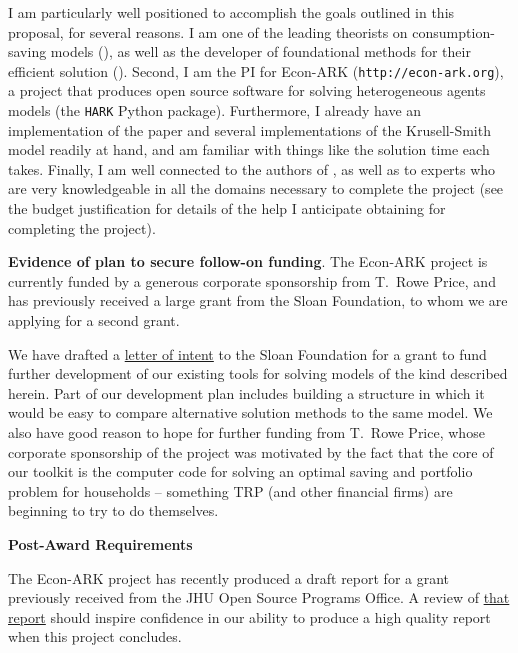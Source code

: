 \documentclass[11pt,pdftex,letterpaper]{article}
\begin{document}
I am particularly well positioned to accomplish the goals outlined in this proposal, for several reasons.  I am one of the leading theorists on consumption-saving models (\cite{CarrollBuffer}), as well as the developer of foundational methods for their efficient solution (\cite{CarrollEGM}). Second, I am the PI for Econ-ARK (\texttt{http://econ-ark.org}), a project that produces open source software for solving heterogeneous agents models (the \texttt{HARK} Python package).  Furthermore, I already have an implementation of the \cite{MALIAR202176} paper and several implementations of the Krusell-Smith model readily at hand, and am familiar with things like the solution time each takes. Finally, I am well connected to the authors of \cite{MALIAR202176}, as well as to experts who are very knowledgeable in all the domains necessary to complete the project (see the budget justification for details of the help I anticipate obtaining for completing the project).

\textbf{Evidence of plan to secure follow-on funding}. 
The Econ-ARK project is currently funded by a generous corporate sponsorship from T.\ Rowe Price, and has previously received a large grant from the Sloan Foundation, to whom we are applying for a second grant.

We have drafted a \href{https://github.com/econ-ark/OverARK/blob/master/roadmap/docs/Sloan/2024-Small-Grant/TwoPageLOIforEcon-ARK_Sloan.md}{letter of intent} to the Sloan Foundation for a grant to fund further development of our existing tools for solving models of the kind described herein.  Part of our development plan includes building a structure in which it would be easy to compare alternative solution methods to the same model. We also have good reason to hope for further funding from T.\ Rowe Price, whose corporate sponsorship of the project was motivated by the fact that the core of our toolkit is the computer code for solving an optimal saving and portfolio problem for households -- something TRP (and other financial firms) are beginning to try to do themselves.


\textbf{Post-Award Requirements}

The Econ-ARK project has recently produced a draft report for a grant previously received from the JHU Open Source Programs Office.  A review of \href{https://econ-ark.github.io/FOSSProF/}{that report} should inspire confidence in our ability to produce a high quality report when this project concludes. 

\end{document}
